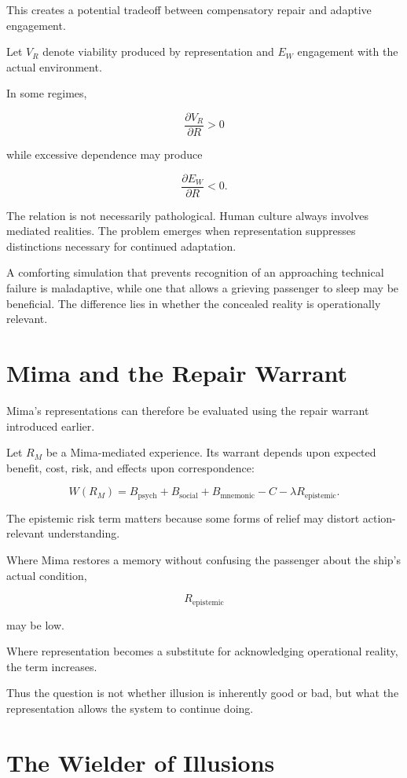 \documentclass[11pt,oneside]{book}
\theoremstyle{definition}
\theoremstyle{remark}
\begin{document}
This creates a potential tradeoff between compensatory repair and adaptive engagement.

Let \(V_R\) denote viability produced by representation and \(E_W\) engagement with the actual environment.

In some regimes,

\[
\frac{\partial V_R}{\partial R}>0
\]

while excessive dependence may produce

\[
\frac{\partial E_W}{\partial R}<0.
\]

The relation is not necessarily pathological. Human culture always involves mediated realities. The problem emerges when representation suppresses distinctions necessary for continued adaptation.

A comforting simulation that prevents recognition of an approaching technical failure is maladaptive, while one that allows a grieving passenger to sleep may be beneficial. The difference lies in whether the concealed reality is operationally relevant.

\section{Mima and the Repair Warrant}

Mima's representations can therefore be evaluated using the repair warrant introduced earlier.

Let \(R_M\) be a Mima-mediated experience. Its warrant depends upon expected benefit, cost, risk, and effects upon correspondence:

\[
W(R_M)
=
B_{\mathrm{psych}}
+
B_{\mathrm{social}}
+
B_{\mathrm{mnemonic}}
-
C
-
\lambda R_{\mathrm{epistemic}}.
\]

The epistemic risk term matters because some forms of relief may distort action-relevant understanding.

Where Mima restores a memory without confusing the passenger about the ship's actual condition,

\[
R_{\mathrm{epistemic}}
\]

may be low.

Where representation becomes a substitute for acknowledging operational reality, the term increases.

Thus the question is not whether illusion is inherently good or bad, but what the representation allows the system to continue doing.

\section{The Wielder of Illusions}
\end{document}
